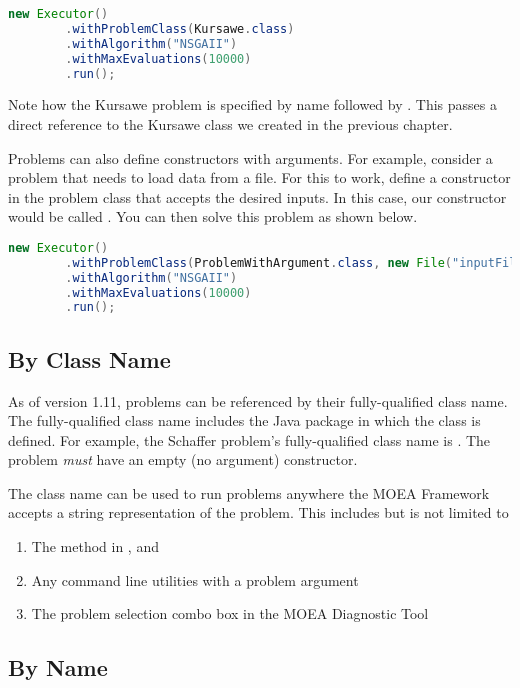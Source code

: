 \begin{lstlisting}[language=Java]
new Executor()
		.withProblemClass(Kursawe.class)
		.withAlgorithm("NSGAII")
		.withMaxEvaluations(10000)
		.run();
\end{lstlisting}

Note how the Kursawe problem is specified by name followed by .  This passes a direct reference to the Kursawe class we created in the previous chapter.

Problems can also define constructors with arguments.  For example, consider a problem that needs to load data from a file.  For this to work, define a constructor in the problem class that accepts the desired inputs.  In this case, our constructor would be called .  You can then solve this problem as shown below.

\begin{lstlisting}[language=Java]
new Executor()
		.withProblemClass(ProblemWithArgument.class, new File("inputFile.txt"))
		.withAlgorithm("NSGAII")
		.withMaxEvaluations(10000)
		.run();
\end{lstlisting}

\subsection{By Class Name}
As of version 1.11, problems can be referenced by their fully-qualified class name.  The fully-qualified class name includes the Java package in which the class is defined.  For example, the Schaffer problem's fully-qualified class name is .  The problem \emph{must} have an empty (no argument) constructor.

The class name can be used to run problems anywhere the MOEA Framework accepts a string representation of the problem.  This includes but is not limited to
\begin{enumerate}
  \item The  method in ,  and 
  \item Any command line utilities with a problem argument
  \item The problem selection combo box in the MOEA Diagnostic Tool
\end{enumerate}

\subsection{By Name}

